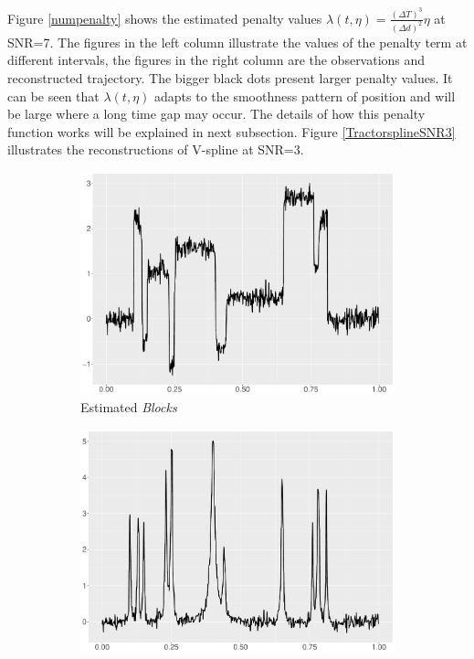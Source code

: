 Figure \ref{numpenalty} shows the estimated penalty values $\lambda(t,\eta)=\frac{\left(\Delta T\right)^3}{\left(\Delta d\right)^2}\eta$ at SNR=7. The figures in the left column illustrate the values of the penalty term at different intervals, the figures in the right column are the observations and reconstructed trajectory. The bigger black dots present larger penalty values. It can be seen that $\lambda(t,\eta)$ adapts to the smoothness pattern of position and will be large where a long time gap may occur. The details of how this penalty function works will be explained in next subsection. Figure \ref{TractorsplineSNR3} illustrates the reconstructions of V-spline at SNR=3.


\begin{figure}
    \centering
    \begin{subfigure}{0.45\textwidth}
    \centering
    \includegraphics[width=\textwidth]{Chapters/02TractorSplineTheory/plot/ggplot/ggBlocksTractorVelocity.pdf}
    \caption{Estimated \textit{Blocks}  }
    \end{subfigure}%
    \begin{subfigure}{0.45\textwidth}
    \centering
    \includegraphics[width=\textwidth]{Chapters/02TractorSplineTheory/plot/ggplot/ggBumpsTractorVelocity.pdf}

\end{subfigure}
\end{figure}
